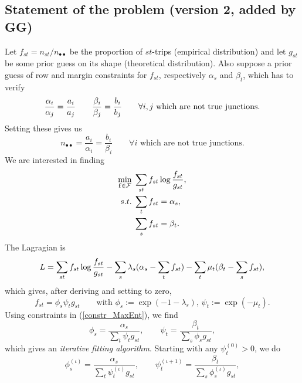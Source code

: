 \documentclass{bmcart}
\begin{document}
\subsection{Statement of the problem (version 2, added by GG)}
Let $f_{st}=n_{st}/n_{\bullet\bullet}$ be the proportion of $st$-trips (empirical distribution) and let $g_{st}$ be some prior guess on its shape (theoretical distribution). Also suppose a prior guess of row and margin constraints for $f_{st}$, respectively $\alpha_s$ and $\beta_t$, which has to verify 
\begin{equation}
	\label{init_margin}
	\frac{\alpha_i}{\alpha_j} = \frac{a_i}{a_j} \qquad \frac{\beta_i}{\beta_j} = \frac{b_i}{b_j}  \qquad \forall i, j \text{ which are not true junctions.} \\
\end{equation}
Setting these gives us
\begin{equation}
	\label{flow_sum}
	n_{\bullet \bullet} = \frac{a_i}{\alpha_i} = \frac{b_i}{\beta_i} \qquad \forall i \text{ which are not true junctions.}  
\end{equation}
We are interested in finding
\begin{align}
	\label{constr_MaxEnt}
	\min_{\mathbf{f}\in\mathcal{F}} &\; \sum_{st}f_{st}\log \frac{f_{st}}{g_{st}}, \notag \\
	s.t. &\; \sum_t f_{st} = \alpha_s, \notag \\
	&\; \sum_s f_{st} = \beta_t.
\end{align}
The Lagragian is
\begin{equation}
	L = \sum_{st}f_{st}\log \frac{f_{st}}{g_{st}} - \sum_s \lambda_s (\alpha_s - \sum_t f_{st}) - \sum_t \mu_t (\beta_t - \sum_s f_{st}), \notag
\end{equation}
which gives, after deriving and setting to zero,
\begin{equation}
	\label{Sol}
	f_{st} = \phi_s \psi_t g_{st} \qquad \text{with } \phi_s := \exp(- 1 - \lambda_s) \text{, } \psi_t := \exp(- \mu_t).
\end{equation}
Using constraints in (\ref{constr_MaxEnt}), we find
\begin{equation}
	\label{Sol_LagMult}
	\phi_s = \frac{\alpha_s}{\sum_t \psi_t g_{st}}, \qquad \psi_t = \frac{\beta_t}{\sum_s \phi_s g_{st}}, 
\end{equation}
which gives an \emph{iterative fitting algorithm}. Starting with any $\psi^{(0)}_t > 0$, we do
\begin{equation}
	\label{Iterative fitting}
	\phi^{(\iota)}_s = \frac{\alpha_s}{\sum_t \psi^{(\iota)}_t g_{st}}, \qquad \psi^{(\iota + 1)}_t = \frac{\beta_t}{\sum_s \phi^{(\iota)}_s g_{st}}, 
\end{equation}
\end{document}
